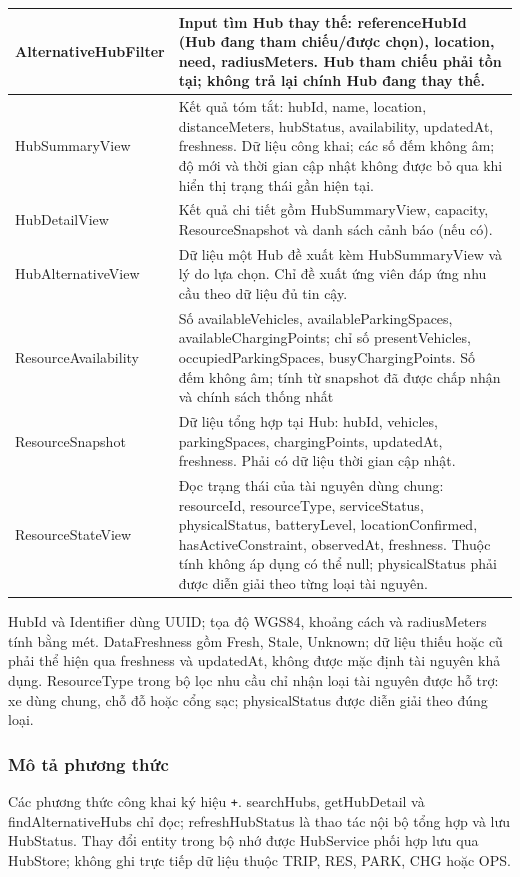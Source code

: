\begin{longtable}{|L{37mm}|L{102mm}|}
Alternative\allowbreak Hub\allowbreak Filter & Input tìm Hub thay thế: referenceHubId (Hub đang tham chiếu/được chọn), location, need, radiusMeters.  Hub tham chiếu phải tồn tại; không trả lại chính Hub đang thay thế.\\\hline
HubSummaryView & Kết quả tóm tắt: hubId, name, location, distanceMeters, hubStatus, availability, updatedAt, freshness.  Dữ liệu công khai; các số đếm không âm; độ mới và thời gian cập nhật không được bỏ qua khi hiển thị trạng thái gần hiện tại.\\\hline
HubDetailView & Kết quả chi tiết gồm HubSummaryView, capacity, ResourceSnapshot và danh sách cảnh báo (nếu có).\\\hline
Hub\allowbreak Alternative\allowbreak View & Dữ liệu một Hub đề xuất kèm HubSummaryView và lý do lựa chọn.  Chỉ đề xuất ứng viên đáp ứng nhu cầu theo dữ liệu đủ tin cậy.\\\hline
Resource\allowbreak Availability & Số availableVehicles, available\allowbreak Parking\allowbreak Spaces, available\allowbreak Charging\allowbreak Points; chỉ số presentVehicles, occupied\allowbreak Parking\allowbreak Spaces, busy\allowbreak Charging\allowbreak Points.  Số đếm không âm; tính từ snapshot đã được chấp nhận và chính sách thống nhất\\\hline
ResourceSnapshot & Dữ liệu tổng hợp tại Hub: hubId, vehicles, parkingSpaces, chargingPoints, updatedAt, freshness.  Phải có dữ liệu thời gian cập nhật.\\\hline
ResourceStateView & Đọc trạng thái của tài nguyên dùng chung: resourceId, resourceType, serviceStatus, physicalStatus, batteryLevel, locationConfirmed, has\allowbreak Active\allowbreak Constraint, observedAt, freshness.  Thuộc tính không áp dụng có thể null; physicalStatus phải được diễn giải theo từng loại tài nguyên.\\\hline
\end{longtable}

HubId và Identifier dùng UUID; tọa độ WGS84, khoảng cách và radiusMeters tính bằng mét. DataFreshness gồm Fresh, Stale, Unknown; dữ liệu thiếu hoặc cũ phải thể hiện qua freshness và updatedAt, không được mặc định tài nguyên khả dụng. ResourceType trong bộ lọc nhu cầu chỉ nhận loại tài nguyên được hỗ trợ: xe dùng chung, chỗ đỗ hoặc cổng sạc; physicalStatus được diễn giải theo đúng loại.

\subsubsection{Mô tả phương thức}
Các phương thức công khai ký hiệu \texttt{+}. searchHubs, getHubDetail và findAlternativeHubs chỉ đọc; refreshHubStatus là thao tác nội bộ tổng hợp và lưu HubStatus. Thay đổi entity trong bộ nhớ được HubService phối hợp lưu qua HubStore; không ghi trực tiếp dữ liệu thuộc TRIP, RES, PARK, CHG hoặc OPS.

